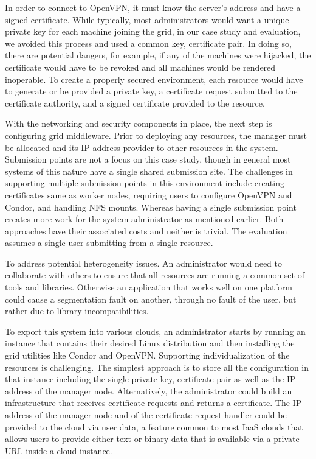 \documentclass[twocolumn]{svjour3}
\begin{document}
In order to connect to OpenVPN, it must know the server's address and have a
signed certificate.  While typically, most administrators would want a unique
private key for each machine joining the grid, in our case study and
evaluation, we avoided this process and used a common key, certificate pair.
In doing so, there are potential dangers, for example, if any of the machines
were hijacked, the certificate would have to be revoked and all machines would
be rendered inoperable.  To create a properly secured environment, each
resource would have to generate or be provided a private key, a certificate
request submitted to the certificate authority, and a signed certificate
provided to the resource.

With the networking and security components in place, the next step is
configuring grid middleware.  Prior to deploying any resources, the manager
must be allocated and its IP address provider to other resources in the system.
Submission points are not a focus on this case study, though in general most
systems of this nature have a single shared submission site.  The challenges in
supporting multiple submission points in this environment include creating
certificates same as worker nodes,  requiring users to configure OpenVPN and
Condor, and handling NFS mounts.  Whereas having a single submission point
creates more work for the system administrator as mentioned earlier.  Both
approaches have their associated costs and neither is trivial.  The evaluation
assumes a single user submitting from a single resource.

To address potential heterogeneity issues.  An administrator would need to
collaborate with others to ensure that all resources are running a common set
of tools and libraries.  Otherwise an application that works well on one
platform could cause a segmentation fault on another, through no fault of the
user, but rather due to library incompatibilities. 

To export this system into various clouds, an administrator starts by running
an instance that contains their desired Linux distribution and then installing
the grid utilities like Condor and OpenVPN.  Supporting individualization of
the resources is challenging.  The simplest approach is to store all the
configuration in that instance including the single private key, certificate
pair as well as the IP address of the manager node.  Alternatively, the
administrator could build an infrastructure that receives certificate requests
and returns a certificate.  The IP address of the manager node and of the
certificate request handler could be provided to the cloud via user data, a
feature common to most IaaS clouds that allows users to provide either text or
binary data that is available via a private URL inside a cloud instance.
\end{document}
